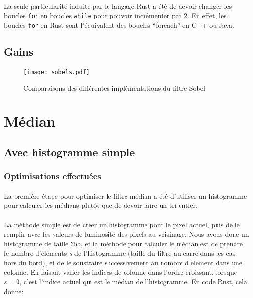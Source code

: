 \documentclass{report}
\begin{document}
\paragraph{} La seule particularité induite par le langage Rust a été de devoir
changer les boucles \texttt{for} en boucles \texttt{while}
pour pouvoir incrémenter par 2. En effet, les boucles \texttt{for} en
Rust sont l'équivalent des boucles ``foreach'' en C++ ou Java.

\subsection{Gains}

\paragraph{}

\begin{figure}[H]
	\centering
	\texttt{[image: sobels.pdf]}%
	\label{fig:sobels}
	\caption{Comparaisons des différentes implémentations du filtre Sobel}
\end{figure}

\section{Médian}

\subsection{Avec histogramme simple}

\subsubsection{Optimisations effectuées}

\paragraph{} La première étape pour optimiser le filtre médian a été d'utiliser
un histogramme pour calculer les médians plutôt que de devoir faire un tri
entier.

\paragraph{} La méthode simple est de créer un histogramme pour le pixel
actuel, puis de le remplir avec les valeurs de luminosité des pixels au
voisinage. Nous avons donc un histogramme de taille 255, et la méthode pour
calculer le médian est de prendre le nombre d'éléments $s$ de l'histogramme
(taille du filtre au carré dans les cas hors du bord), et de le soustraire
successivement au nombre d'élément dans une colonne. En faisant varier les
indices de colonne dans l'ordre croissant, lorsque $s = 0$, c'est l'indice
actuel qui est le médian de l'histogramme. En code Rust, cela donne:
\end{document}
